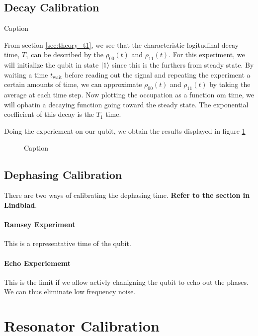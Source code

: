 \subsection{Decay Calibration}\label{sec:calibration_t1}
\begin{marginfigure}
    \centering
    \caption{Caption}
    \label{fig:enter-label}
\end{marginfigure}

From section \ref{sec:theory_t1}, we see that the characteristic logitudinal decay time, $T_1$ can be described by the $\rho_{00}(t)$ and $\rho_{11}(t)$. For this experiment, we will initialize the qubit in state $\ket{1}$ since this is the furthers from steady state. By waiting a time $t_{\text{wait}}$ before reading out the signal and repeating the experiment a certain amounts of time, we can approximate  $\rho_{00}(t)$ and $\rho_{11}(t)$ by taking the average at each time step. Now plotting the occupation as a function om time, we will opbatin a decaying function going toward the steady state. The exponential coefficient of this decay is the $T_1$ time. 


Doing the experiement on our qubit, we obtain the results displayed in figure \ref{fig:T_1_decay_calibration}

\begin{figure}
    \centering
    \caption{Caption}
    \label{fig:T_1_decay_calibration}
\end{figure}

\subsection{Dephasing Calibration}
There are two ways of calibrating the dephasing time. \textbf{Refer to the section in Lindblad}.

\paragraph{Ramsey Experiment}
This is a representative time of the qubit.

\paragraph{Echo Experiememt}
This is the limit if we allow activly chanigning the qubit to echo out the phases. We can thus eliminate low frequency noise.


\section{Resonator Calibration}
